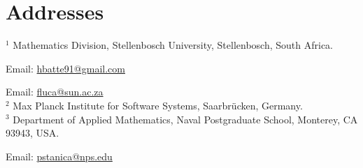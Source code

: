 \documentclass[11pt,a4paper]{article}
\numberwithin{equation}{section}
\numberwithin{table}{section}
\numberwithin{figure}{section}
\begin{document}
\section*{Addresses}

$ ^{1} $ Mathematics Division, Stellenbosch University, Stellenbosch, South Africa.

Email: \url{hbatte91@gmail.com}

Email: \url{fluca@sun.ac.za}
\\
$ ^{2} $ Max Planck Institute for Software Systems, Saarbr\"ucken, Germany.
\\
$ ^{3} $ Department of Applied Mathematics, Naval Postgraduate School, Monterey, CA 93943, USA.

Email: \url{pstanica@nps.edu}
\end{document}
